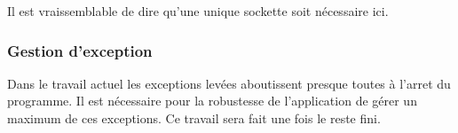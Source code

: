 Il est vraissemblable de dire qu'une unique sockette soit nécessaire ici. 


\subsubsection*{Gestion d'exception}
Dans le travail actuel les exceptions levées aboutissent presque toutes à l'arret du programme. Il est nécessaire pour la robustesse de l'application de gérer un maximum de ces exceptions. Ce travail sera fait une fois le reste fini.


